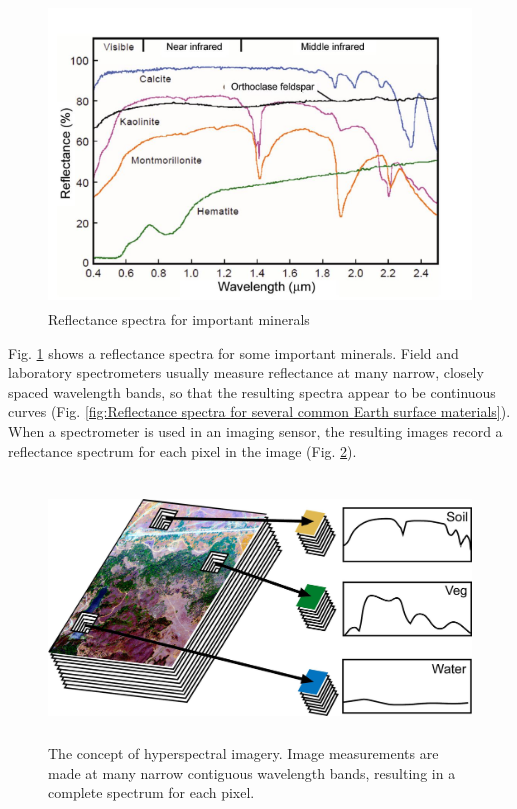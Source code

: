 \documentclass[document.tex]{subfiles}
\begin{document}
\begin{figure}[H]
	\begin{center}
		\includegraphics[height=8.0cm]{imgs/Minerals.png}
	\end{center}
	\caption{Reflectance spectra for important minerals\cite{35}}
	\label{fig:Reflectance spectra for important minerals}
\end{figure}
\noindent Fig. \ref{fig:Reflectance spectra for important minerals} shows a reflectance spectra for some important minerals. Field and laboratory spectrometers usually measure reflectance at many narrow,
closely spaced wavelength bands, so that the resulting spectra appear to be continuous curves (Fig. \ref{fig:Reflectance spectra for several common Earth surface materials}). When a spectrometer is used in an imaging sensor, the resulting
images record a reflectance spectrum for each pixel in the image (Fig. \ref{fig:Hyperspectral imagery}).
\begin{figure}[H]
	\begin{center}
		\includegraphics[height=7.0cm]{imgs/Hyperspectral_imagery.jpg}
	\end{center}
	\caption{The concept of hyperspectral imagery. Image measurements are made at
		many narrow contiguous wavelength bands, resulting in a complete spectrum for each
		pixel.\cite{35}}
	\label{fig:Hyperspectral imagery}
\end{figure}
\end{document}
